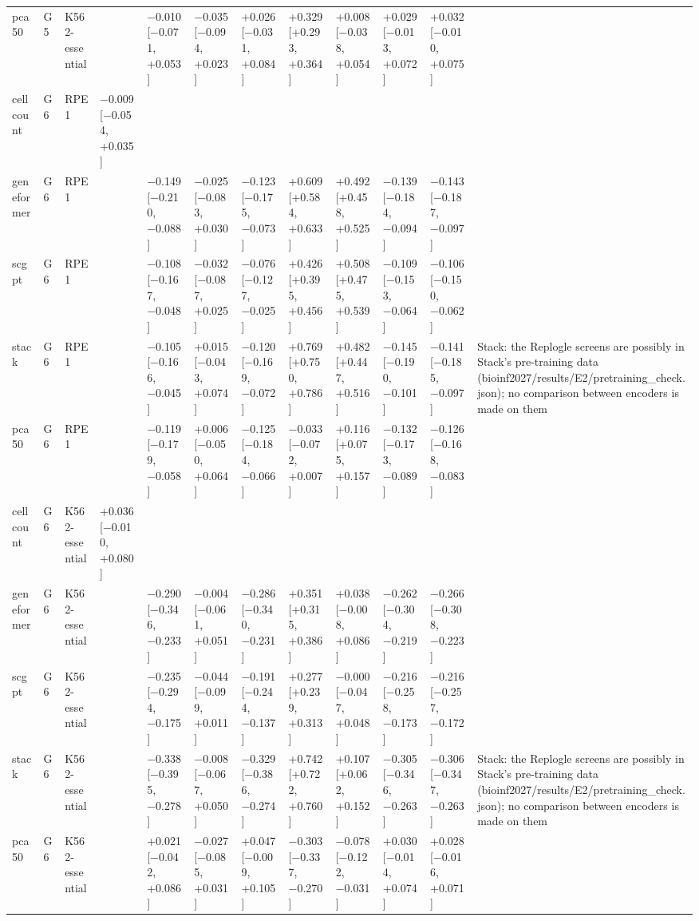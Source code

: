 \begin{tabular}{llllllllllll}
pca50 & G5 & K562-essential &  & −0.010 [−0.071, +0.053] & −0.035 [−0.094, +0.023] & +0.026 [−0.031, +0.084] & +0.329 [+0.293, +0.364] & +0.008 [−0.038, +0.054] & +0.029 [−0.013, +0.072] & +0.032 [−0.010, +0.075] &  \\
cell count & G6 & RPE1 & −0.009 [−0.054, +0.035] &  &  &  &  &  &  &  &  \\
geneformer & G6 & RPE1 &  & −0.149 [−0.210, −0.088] & −0.025 [−0.083, +0.030] & −0.123 [−0.175, −0.073] & +0.609 [+0.584, +0.633] & +0.492 [+0.458, +0.525] & −0.139 [−0.184, −0.094] & −0.143 [−0.187, −0.097] &  \\
scgpt & G6 & RPE1 &  & −0.108 [−0.167, −0.048] & −0.032 [−0.087, +0.025] & −0.076 [−0.127, −0.025] & +0.426 [+0.395, +0.456] & +0.508 [+0.475, +0.539] & −0.109 [−0.153, −0.064] & −0.106 [−0.150, −0.062] &  \\
stack & G6 & RPE1 &  & −0.105 [−0.166, −0.045] & +0.015 [−0.043, +0.074] & −0.120 [−0.169, −0.072] & +0.769 [+0.750, +0.786] & +0.482 [+0.447, +0.516] & −0.145 [−0.190, −0.101] & −0.141 [−0.185, −0.097] & Stack: the Replogle screens are possibly in Stack's pre-training data (bioinf2027/results/E2/pretraining\_check.json); no comparison between encoders is made on them \\
pca50 & G6 & RPE1 &  & −0.119 [−0.179, −0.058] & +0.006 [−0.050, +0.064] & −0.125 [−0.184, −0.066] & −0.033 [−0.072, +0.007] & +0.116 [+0.075, +0.157] & −0.132 [−0.173, −0.089] & −0.126 [−0.168, −0.083] &  \\
cell count & G6 & K562-essential & +0.036 [−0.010, +0.080] &  &  &  &  &  &  &  &  \\
geneformer & G6 & K562-essential &  & −0.290 [−0.346, −0.233] & −0.004 [−0.061, +0.051] & −0.286 [−0.340, −0.231] & +0.351 [+0.315, +0.386] & +0.038 [−0.008, +0.086] & −0.262 [−0.304, −0.219] & −0.266 [−0.308, −0.223] &  \\
scgpt & G6 & K562-essential &  & −0.235 [−0.294, −0.175] & −0.044 [−0.099, +0.011] & −0.191 [−0.244, −0.137] & +0.277 [+0.239, +0.313] & −0.000 [−0.047, +0.048] & −0.216 [−0.258, −0.173] & −0.216 [−0.257, −0.172] &  \\
stack & G6 & K562-essential &  & −0.338 [−0.395, −0.278] & −0.008 [−0.067, +0.050] & −0.329 [−0.386, −0.274] & +0.742 [+0.722, +0.760] & +0.107 [+0.062, +0.152] & −0.305 [−0.346, −0.263] & −0.306 [−0.347, −0.263] & Stack: the Replogle screens are possibly in Stack's pre-training data (bioinf2027/results/E2/pretraining\_check.json); no comparison between encoders is made on them \\
pca50 & G6 & K562-essential &  & +0.021 [−0.042, +0.086] & −0.027 [−0.085, +0.031] & +0.047 [−0.009, +0.105] & −0.303 [−0.337, −0.270] & −0.078 [−0.122, −0.031] & +0.030 [−0.014, +0.074] & +0.028 [−0.016, +0.071] &  \\
\bottomrule
\end{tabular}

